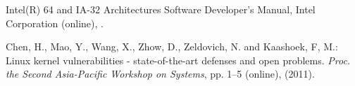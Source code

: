 \documentclass[english,sigrecommended,JIP]{ipsj}
\begin{document}
\begin{thebibliography}{99}
  Intel(R) 64 and IA-32 Architectures Software Developer’s Manual, Intel Corporation (online),  .



    Chen, H., Mao, Y., Wang, X., Zhow, D., Zeldovich, N. and Kaashoek, F, M.: Linux kernel vulnerabilities - state-of-the-art defenses and open problems. \textit{Proc. the Second Asia-Pacific Workshop on Systems}, pp. 1--5 (online),  (2011).



\end{thebibliography}
\end{document}
